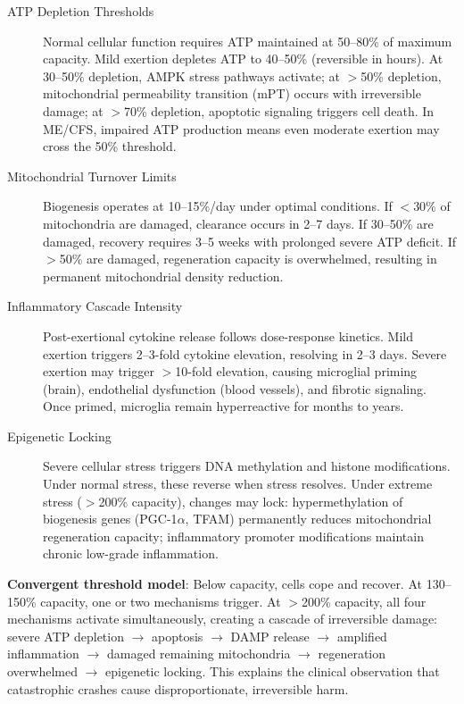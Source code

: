 \begin{description}
    \item[ATP Depletion Thresholds] Normal cellular function requires ATP maintained at 50--80\% of maximum capacity. Mild exertion depletes ATP to 40--50\% (reversible in hours). At 30--50\% depletion, AMPK stress pathways activate; at $>$50\% depletion, mitochondrial permeability transition (mPT) occurs with irreversible damage; at $>$70\% depletion, apoptotic signaling triggers cell death. In ME/CFS, impaired ATP production means even moderate exertion may cross the 50\% threshold.

    \item[Mitochondrial Turnover Limits] Biogenesis operates at 10--15\%/day under optimal conditions. If $<$30\% of mitochondria are damaged, clearance occurs in 2--7 days. If 30--50\% are damaged, recovery requires 3--5 weeks with prolonged severe ATP deficit. If $>$50\% are damaged, regeneration capacity is overwhelmed, resulting in permanent mitochondrial density reduction.

    \item[Inflammatory Cascade Intensity] Post-exertional cytokine release follows dose-response kinetics. Mild exertion triggers 2--3-fold cytokine elevation, resolving in 2--3 days. Severe exertion may trigger $>$10-fold elevation, causing microglial priming (brain), endothelial dysfunction (blood vessels), and fibrotic signaling. Once primed, microglia remain hyperreactive for months to years.

    \item[Epigenetic Locking] Severe cellular stress triggers DNA methylation and histone modifications. Under normal stress, these reverse when stress resolves. Under extreme stress ($>$200\% capacity), changes may lock: hypermethylation of biogenesis genes (PGC-1$\alpha$, TFAM) permanently reduces mitochondrial regeneration capacity; inflammatory promoter modifications maintain chronic low-grade inflammation.
\end{description}

\textbf{Convergent threshold model}: Below capacity, cells cope and recover. At 130--150\% capacity, one or two mechanisms trigger. At $>$200\% capacity, all four mechanisms activate simultaneously, creating a cascade of irreversible damage: severe ATP depletion $\rightarrow$ apoptosis $\rightarrow$ DAMP release $\rightarrow$ amplified inflammation $\rightarrow$ damaged remaining mitochondria $\rightarrow$ regeneration overwhelmed $\rightarrow$ epigenetic locking. This explains the clinical observation that catastrophic crashes cause disproportionate, irreversible harm.

